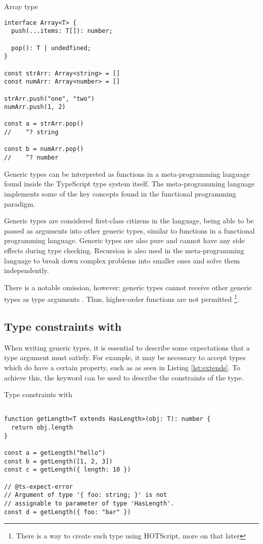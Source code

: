 \begin{listing}[ht]
  \caption{Array type}\label{lst:array-type}
  \begin{verbatim}
interface Array<T> {
  push(...items: T[]): number;

  pop(): T | undedfined;
}

const strArr: Array<string> = []
const numArr: Array<number> = []

strArr.push("one", "two")
numArr.push(1, 2)

const a = strArr.pop()
//    ^? string

const b = numArr.pop()
//    ^? number
\end{verbatim}
\end{listing}

Generic types can be interpreted as functions in a meta-programming language found inside the TypeScript type system itself. The meta-programming language implements some of the key concepts found in the functional programming paradigm.

Generic types are considered first-class citizens in the language, being able to be passed as arguments into other generic types, similar to functions in a functional programming language. Generic types are also pure and cannot have any side effects during type checking. Recursion is also used in the meta-programming language to break down complex problems into smaller ones and solve them independently.

There is a notable omission, however: generic types cannot receive other generic types as type arguments \cite{TypeInferenceHigherorder}. Thus, higher-order functions are not permitted \footnote{There is a way to create such type using HOTScript, more on that later}.

\subsection{Type constraints with }

When writing generic types, it is essential to describe some expectations that a type argument must satisfy. For example, it may be necessary to accept types which do have a certain property, such as  as seen in Listing \ref{lst:extends}. To achieve this, the  keyword can be used to describe the constraints of the type.

\begin{listing}[ht]
  \caption{Type constraints with }\label{lst:extends}
  \begin{verbatim}

function getLength<T extends HasLength>(obj: T): number {
  return obj.length
}

const a = getLength("hello")
const b = getLength([1, 2, 3])
const c = getLength({ length: 10 })

// @ts-expect-error 
// Argument of type '{ foo: string; }' is not 
// assignable to parameter of type 'HasLength'.
const d = getLength({ foo: "bar" })
\end{verbatim}
\end{listing}


